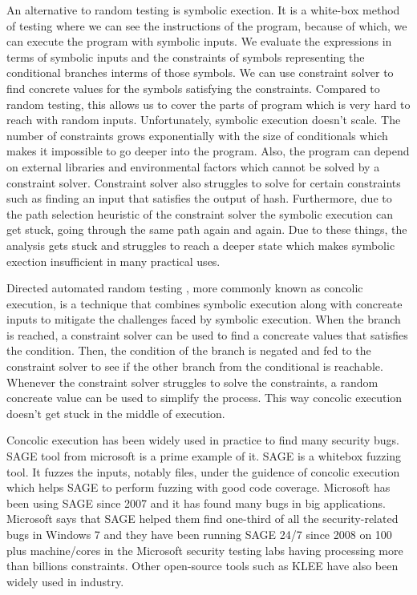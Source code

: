 \documentclass[	runningheads,
				a4paper]{llncs}
\begin{document}
An alternative to random testing is symbolic exection. It is a white-box method of testing where we can see the instructions of the program, because of which, we can execute the program with symbolic inputs. We evaluate the expressions in terms of symbolic inputs and the constraints of symbols representing the conditional branches interms of those symbols. We can use constraint solver to find concrete values for the symbols satisfying the constraints. Compared to random testing, this allows us to cover the parts of program which is very hard to reach with random inputs. Unfortunately, symbolic execution doesn't scale. The number of constraints grows exponentially with the size of conditionals which makes it impossible to go deeper into the program. Also, the program can depend on external libraries and environmental factors which cannot be solved by a constraint solver. Constraint solver also struggles to solve for certain constraints such as finding an input that satisfies the output of hash. Furthermore, due to the path selection heuristic of the constraint solver the symbolic execution can get stuck, going through the same path again and again. Due to these things, the analysis gets stuck and struggles to reach a deeper state which makes symbolic exection insufficient in many practical uses.

Directed automated random testing \cite[DART]{godefroid2005dart}, more commonly known as concolic execution, is a technique that combines symbolic execution along with concreate inputs to mitigate the challenges faced by symbolic execution. When the branch is reached, a constraint solver can be used to find a concreate values that satisfies the condition. Then, the condition of the branch is negated and fed to the constraint solver to see if the other branch from the conditional is reachable. Whenever the constraint solver struggles to solve the constraints, a random concreate value can be used to simplify the process. This way concolic execution doesn't get stuck in the middle of execution. 

Concolic execution has been widely used in practice to find many security bugs. SAGE \cite{godefroid2012sage} tool from microsoft is a prime example of it. SAGE is a whitebox fuzzing tool. It fuzzes the inputs, notably files,
under the guidence of concolic execution which helps SAGE to perform fuzzing with good code coverage. Microsoft has been using SAGE since 2007 and it has found many bugs in big applications. Microsoft says \cite{godefroid2012sage} that SAGE helped them find one-third of all the security-related bugs in Windows 7 and they have been running SAGE 24/7 since 2008 on 100 plus machine/cores in the Microsoft security testing labs having processing more than billions constraints. Other open-source tools such as KLEE \cite{cadar2008klee} have also been widely used in industry.
\end{document}

